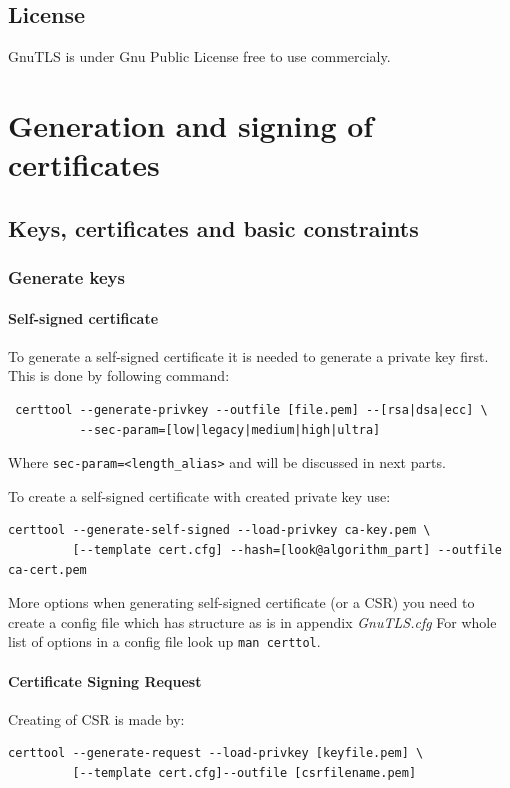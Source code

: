 \documentclass[10pt, a4paper]{report}
\begin{document}
  \subsection{License}
GnuTLS is under Gnu Public License \- free to use commercialy.
  
\section{Generation and signing of certificates}

  \subsection{Keys, certificates and basic constraints}
  
    \subsubsection{Generate keys}
    
      \paragraph{Self-signed certificate}
To generate a self-signed certificate it is needed to generate a private key first. This is done by following command:
\begin{verbatim}
 certtool --generate-privkey --outfile [file.pem] --[rsa|dsa|ecc] \
          --sec-param=[low|legacy|medium|high|ultra]
\end{verbatim}
Where \verb+sec-param=<length_alias>+ and will be discussed in next parts.

To create a self-signed certificate with created private key use:
\begin{verbatim}
certtool --generate-self-signed --load-privkey ca-key.pem \
         [--template cert.cfg] --hash=[look@algorithm_part] --outfile ca-cert.pem
\end{verbatim}

More options when generating self-signed certificate (or a CSR) you need to create a config file which has structure as is in appendix \textit{GnuTLS.cfg} 
For whole list of options in a config file look up \verb+man certtol+.
      
\paragraph{Certificate Signing Request}
Creating of CSR is made by:
\begin{verbatim}
certtool --generate-request --load-privkey [keyfile.pem] \
         [--template cert.cfg]--outfile [csrfilename.pem]
\end{verbatim}
\end{document}

